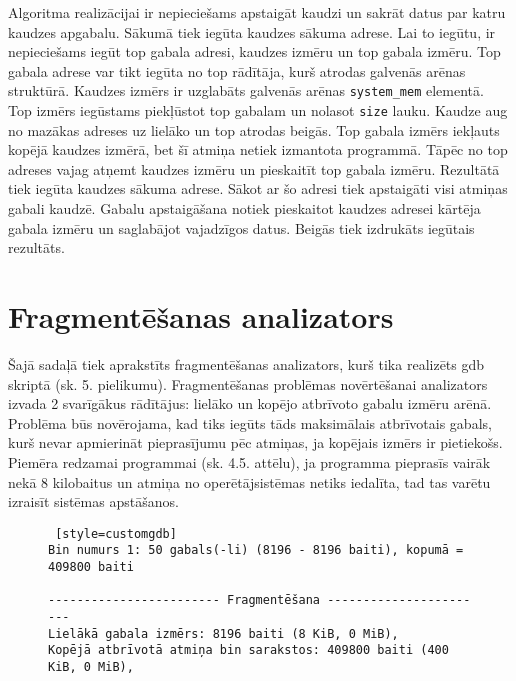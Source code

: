 Algoritma realizācijai ir nepieciešams apstaigāt kaudzi un sakrāt datus par katru kaudzes apgabalu.
Sākumā tiek iegūta kaudzes sākuma adrese.
Lai to iegūtu, ir nepieciešams iegūt top gabala adresi, kaudzes izmēru un top gabala izmēru.
Top gabala adrese var tikt iegūta no top rādītāja, kurš atrodas galvenās arēnas struktūrā.
Kaudzes izmērs ir uzglabāts galvenās arēnas \texttt{system\_mem} elementā.
Top izmērs iegūstams piekļūstot top gabalam un nolasot \texttt{size} lauku.
Kaudze aug no mazākas adreses uz lielāko un top atrodas beigās.
Top gabala izmērs iekļauts kopējā kaudzes izmērā, bet šī atmiņa netiek izmantota programmā.
Tāpēc no top adreses vajag atņemt kaudzes izmēru un pieskaitīt top gabala izmēru.
Rezultātā tiek iegūta kaudzes sākuma adrese.
Sākot ar šo adresi tiek apstaigāti visi atmiņas gabali kaudzē.
Gabalu apstaigāšana notiek pieskaitot kaudzes adresei kārtēja gabala izmēru un saglabājot vajadzīgos datus.
Beigās tiek izdrukāts iegūtais rezultāts.



\section{Fragmentēšanas analizators}
Šajā sadaļā tiek aprakstīts fragmentēšanas analizators, kurš tika realizēts gdb skriptā (sk. 5. pielikumu).
Fragmentēšanas problēmas novērtēšanai analizators izvada 2 svarīgākus rādītājus: lielāko un kopējo atbrīvoto gabalu izmēru arēnā.
Problēma būs novērojama, kad tiks iegūts tāds maksimālais atbrīvotais gabals, kurš nevar apmierināt pieprasījumu pēc atmiņas, ja kopējais izmērs ir pietiekošs.
Piemēra redzamai programmai (sk. 4.5. attēlu), ja programma pieprasīs vairāk nekā 8 kilobaitus un atmiņa no operētājsistēmas netiks iedalīta, tad tas varētu izraisīt sistēmas apstāšanos.
\begin{figure}[h]
\begin{lstlisting} [style=customgdb]
Bin numurs 1: 50 gabals(-li) (8196 - 8196 baiti), kopumā = 409800 baiti

------------------------ Fragmentēšana -----------------------
Lielākā gabala izmērs: 8196 baiti (8 KiB, 0 MiB),
Kopējā atbrīvotā atmiņa bin sarakstos: 409800 baiti (400 KiB, 0 MiB),
\end{lstlisting}
\caption{\textbf{\fontsize{11}{12}\selectfont {Fragmentēšanas rādītāji}}}
\end{figure}

